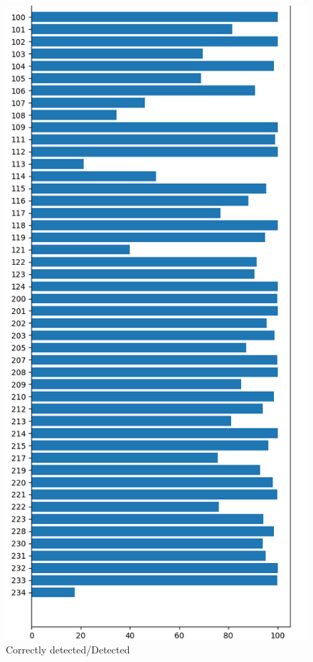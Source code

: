 \documentclass[conference]{IEEEtran}
\begin{document}
\begin{figure}[H]
\centerline{\includegraphics[scale=0.6]{imagenes/EfectividadDetectados}}
\caption{Correctly detected/Detected}
\label{fig}
\end{figure}
\end{document}
